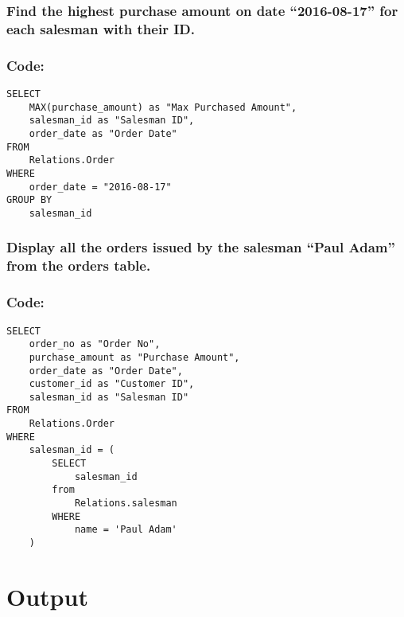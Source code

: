 \documentclass[12pt]{article}
\begin{document}
\subsubsection{Find the highest purchase amount on date “2016-08-17” for each salesman with their ID.}
\subsubsection*{Code:}
\begin{verbatim}
SELECT
    MAX(purchase_amount) as "Max Purchased Amount",
    salesman_id as "Salesman ID",
    order_date as "Order Date"
FROM
    Relations.Order
WHERE
    order_date = "2016-08-17"
GROUP BY
    salesman_id
\end{verbatim}

\vspace{5mm}
\subsubsection{Display all the orders issued by the salesman “Paul Adam” from the orders table.}
\subsubsection*{Code:}
\begin{verbatim}
SELECT
    order_no as "Order No",
    purchase_amount as "Purchase Amount",
    order_date as "Order Date",
    customer_id as "Customer ID",
    salesman_id as "Salesman ID"
FROM
    Relations.Order
WHERE
    salesman_id = (
        SELECT
            salesman_id
        from
            Relations.salesman
        WHERE
            name = 'Paul Adam'
    )
\end{verbatim}

\section{Output}

\end{document}
